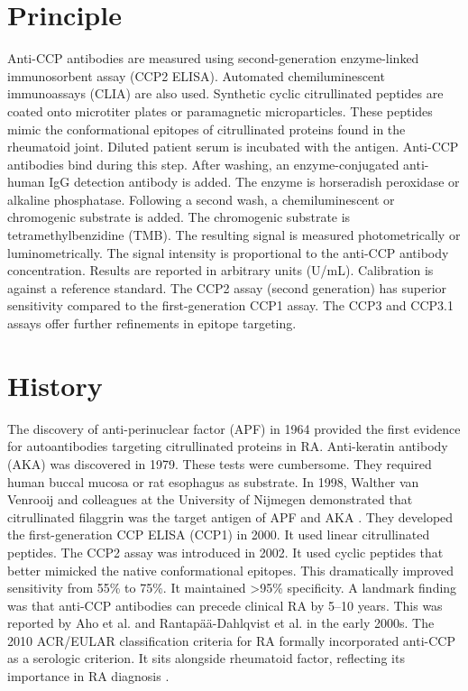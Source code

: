 \section*{Principle}
Anti-CCP antibodies are measured using second-generation enzyme-linked immunosorbent assay (CCP2 ELISA). Automated chemiluminescent immunoassays (CLIA) are also used. Synthetic cyclic citrullinated peptides are coated onto microtiter plates or paramagnetic microparticles. These peptides mimic the conformational epitopes of citrullinated proteins found in the rheumatoid joint. Diluted patient serum is incubated with the antigen. Anti-CCP antibodies bind during this step. After washing, an enzyme-conjugated anti-human IgG detection antibody is added. The enzyme is horseradish peroxidase or alkaline phosphatase. Following a second wash, a chemiluminescent or chromogenic substrate is added. The chromogenic substrate is tetramethylbenzidine (TMB). The resulting signal is measured photometrically or luminometrically. The signal intensity is proportional to the anti-CCP antibody concentration. Results are reported in arbitrary units (U/mL). Calibration is against a reference standard. The CCP2 assay (second generation) has superior sensitivity compared to the first-generation CCP1 assay. The CCP3 and CCP3.1 assays offer further refinements in epitope targeting.

\section*{History}
The discovery of anti-perinuclear factor (APF) in 1964 provided the first evidence for autoantibodies targeting citrullinated proteins in RA. Anti-keratin antibody (AKA) was discovered in 1979. These tests were cumbersome. They required human buccal mucosa or rat esophagus as substrate. In 1998, Walther van Venrooij and colleagues at the University of Nijmegen demonstrated that citrullinated filaggrin was the target antigen of APF and AKA \cite{schellekens1998}. They developed the first-generation CCP ELISA (CCP1) in 2000. It used linear citrullinated peptides. The CCP2 assay was introduced in 2002. It used cyclic peptides that better mimicked the native conformational epitopes. This dramatically improved sensitivity from 55\% to 75\%. It maintained >95\% specificity. A landmark finding was that anti-CCP antibodies can precede clinical RA by 5--10 years. This was reported by Aho et al. and Rantap\"a\"a-Dahlqvist et al. in the early 2000s. The 2010 ACR/EULAR classification criteria for RA formally incorporated anti-CCP as a serologic criterion. It sits alongside rheumatoid factor, reflecting its importance in RA diagnosis \cite{aletaha2010}.

